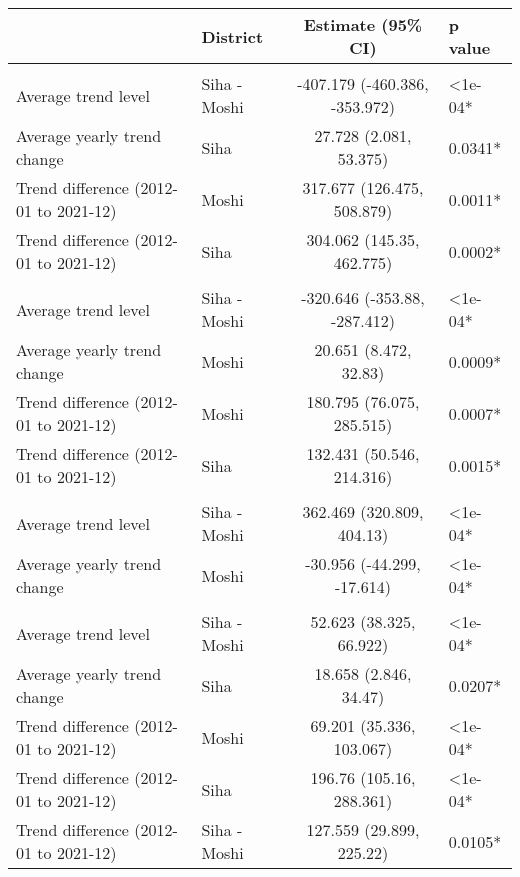 \begingroup
\fontsize{12.0pt}{14.4pt}\selectfont
\begin{longtable}{l|lcl}
\toprule
 & District & Estimate (95\% CI) & p value \\ 
\midrule\addlinespace[2.5pt]
\multicolumn{4}{l}{Cardiovascular Diseases} \\[2.5pt] 
\midrule\addlinespace[2.5pt]
Average trend level & Siha - Moshi & -407.179 (-460.386, -353.972) & <1e-04* \\ 
Average yearly trend change & Siha & 27.728 (2.081, 53.375) & 0.0341* \\ 
Trend difference (2012-01 to 2021-12) & Moshi & 317.677 (126.475, 508.879) & 0.0011* \\ 
Trend difference (2012-01 to 2021-12) & Siha & 304.062 (145.35, 462.775) & 0.0002* \\ 
\midrule\addlinespace[2.5pt]
\multicolumn{4}{l}{Diabetes Mellitus} \\[2.5pt] 
\midrule\addlinespace[2.5pt]
Average trend level & Siha - Moshi & -320.646 (-353.88, -287.412) & <1e-04* \\ 
Average yearly trend change & Moshi & 20.651 (8.472, 32.83) & 0.0009* \\ 
Trend difference (2012-01 to 2021-12) & Moshi & 180.795 (76.075, 285.515) & 0.0007* \\ 
Trend difference (2012-01 to 2021-12) & Siha & 132.431 (50.546, 214.316) & 0.0015* \\ 
\midrule\addlinespace[2.5pt]
\multicolumn{4}{l}{Gastrointestinal Infections} \\[2.5pt] 
\midrule\addlinespace[2.5pt]
Average trend level & Siha - Moshi & 362.469 (320.809, 404.13) & <1e-04* \\ 
Average yearly trend change & Moshi & -30.956 (-44.299, -17.614) & <1e-04* \\ 
\midrule\addlinespace[2.5pt]
\multicolumn{4}{l}{Infectious Eye Disease} \\[2.5pt] 
\midrule\addlinespace[2.5pt]
Average trend level & Siha - Moshi & 52.623 (38.325, 66.922) & <1e-04* \\ 
Average yearly trend change & Siha & 18.658 (2.846, 34.47) & 0.0207* \\ 
Trend difference (2012-01 to 2021-12) & Moshi & 69.201 (35.336, 103.067) & <1e-04* \\ 
Trend difference (2012-01 to 2021-12) & Siha & 196.76 (105.16, 288.361) & <1e-04* \\ 
Trend difference (2012-01 to 2021-12) & Siha - Moshi & 127.559 (29.899, 225.22) & 0.0105* \\ 

\end{longtable}
